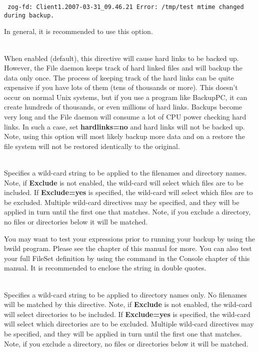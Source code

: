 \begin{description}
\begin{verbatim}
 zog-fd: Client1.2007-03-31_09.46.21 Error: /tmp/test mtime changed during backup.
\end{verbatim}

   In general, it is recommended to use this option.

\item [hardlinks=yes{\textbar}no] \hfill \\
   When enabled (default), this directive will cause hard links to be
   backed up. However, the File daemon keeps track of hard linked files and
   will backup the data only once. The process of keeping track of the
   hard links can be quite expensive if you have lots of them (tens of
   thousands or more). This doesn't occur on normal Unix systems, but if
   you use a program like BackupPC, it can create hundreds of thousands, or
   even millions of hard links. Backups become very long and the File daemon
   will consume a lot of CPU power checking hard links.  In such a case,
   set {\bf hardlinks=no} and hard links will not be backed up.  Note, using
   this option will most likely backup more data and on a restore the file
   system will not be restored identically to the original.

\item [wild={\textless}string{\textgreater}] \hfill \\
   Specifies a wild-card string to be applied to the filenames and
   directory names.  Note, if {\bf Exclude} is not enabled, the wild-card
   will select which files are to be included.  If {\bf Exclude=yes} is
   specified, the wild-card will select which files are to be excluded.
   Multiple wild-card directives may be specified, and they will be applied
   in turn until the first one that matches.  Note, if you exclude a
   directory, no files or directories below it will be matched.

   You may want to test your expressions prior to running your
   backup by using the bwild program. Please see the
    chapter of this manual for
   more. You can also test your full FileSet definition by using
   the  command in the Console
   chapter of this manual.
   It is recommended to enclose the string in double quotes.

\item [wilddir={\textless}string{\textgreater}] \hfill \\
   Specifies a wild-card string to be applied to directory names only.  No
   filenames will be matched by this directive.  Note, if {\bf Exclude} is
   not enabled, the wild-card will select directories to be
   included.  If {\bf Exclude=yes} is specified, the wild-card will select
   which directories are to be excluded.  Multiple wild-card directives may be
   specified, and they will be applied in turn until the first one that
   matches.  Note, if you exclude a directory, no files or directories
   below it will be matched.


\end{description}
